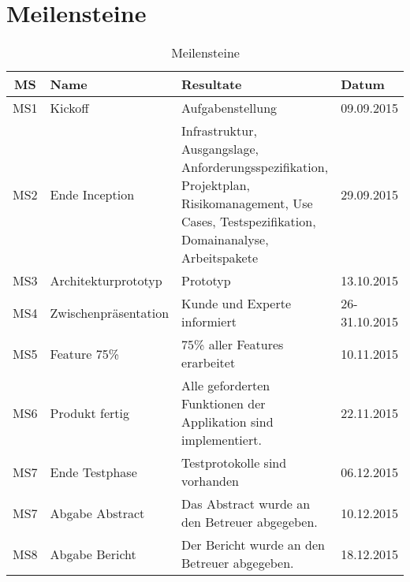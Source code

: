 
\section{Meilensteine}
\label{sec:Meilensteine}


\begin{table}[H]
\begin{tabularx}{\textwidth}{ c | l | X | l}
\textbf{MS} & \textbf{Name} & \textbf{Resultate}  & \textbf{Datum} \\ \hline
MS1 & Kickoff              & Aufgabenstellung & 09.09.2015 \\ \hline
MS2 & Ende Inception       & Infrastruktur, Ausgangslage, Anforderungsspezifikation, Projektplan, Risikomanagement, Use Cases, Testspezifikation, Domainanalyse, Arbeitspakete	& 29.09.2015 \\ \hline
MS3 & Architekturprototyp  & Prototyp	& 13.10.2015 \\ \hline
MS4 & Zwischenpräsentation & Kunde und Experte informiert & 26-31.10.2015 \\ \hline
MS5 & Feature 75\%         & 75\% aller Features erarbeitet & 10.11.2015 \\ \hline
MS6 & Produkt fertig       & Alle geforderten Funktionen der Applikation sind implementiert. & 22.11.2015 \\ \hline
MS7 & Ende Testphase       & Testprotokolle sind vorhanden & 06.12.2015 \\ \hline
MS7 & Abgabe Abstract      & Das Abstract wurde an den Betreuer abgegeben. & 10.12.2015 \\ \hline
MS8 & Abgabe Bericht       & Der Bericht wurde an den Betreuer abgegeben. & 18.12.2015 \\
\end{tabularx}
\caption{Meilensteine}
\end{table}